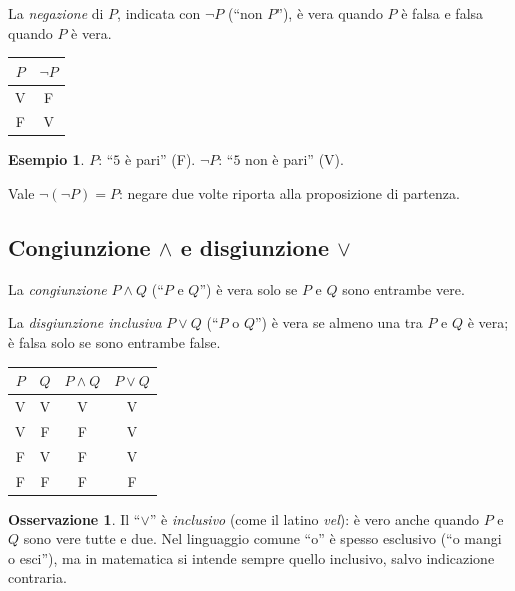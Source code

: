 \documentclass[11pt,a4paper]{article}
\theoremstyle{definition}
\newtheorem*{esempio}{Esempio}
\newtheorem*{osservazione}{Osservazione}
\newcommand{\V}{\textsf{V}}
\newcommand{\F}{\textsf{F}}
\begin{document}
\begin{definizione}
La \emph{negazione} di $P$, indicata con $\neg P$ (``non $P$''), è vera
quando $P$ è falsa e falsa quando $P$ è vera.
\end{definizione}

\begin{center}
\begin{tabular}{c|c}
$P$ & $\neg P$ \\ \hline
\V & \F \\
\F & \V
\end{tabular}
\end{center}

\begin{esempio}
$P$: ``$5$ è pari'' (\F). \quad $\neg P$: ``$5$ non è pari'' (\V).
\end{esempio}

Vale $\neg(\neg P) = P$: negare due volte riporta alla proposizione di
partenza.

\subsection{Congiunzione $\land$ e disgiunzione $\lor$}

\begin{definizione}
La \emph{congiunzione} $P \land Q$ (``$P$ e $Q$'') è vera solo se $P$ e $Q$
sono entrambe vere.

La \emph{disgiunzione inclusiva} $P \lor Q$ (``$P$ o $Q$'') è vera se
almeno una tra $P$ e $Q$ è vera; è falsa solo se sono entrambe false.
\end{definizione}

\begin{center}
\begin{tabular}{cc|c|c}
$P$ & $Q$ & $P \land Q$ & $P \lor Q$ \\ \hline
\V & \V & \V & \V \\
\V & \F & \F & \V \\
\F & \V & \F & \V \\
\F & \F & \F & \F
\end{tabular}
\end{center}

\begin{osservazione}
Il ``$\lor$'' è \emph{inclusivo} (come il latino \emph{vel}): è vero anche
quando $P$ e $Q$ sono vere tutte e due. Nel linguaggio comune ``o'' è spesso
esclusivo (``o mangi o esci''), ma in matematica si intende sempre quello
inclusivo, salvo indicazione contraria.
\end{osservazione}
\end{document}
